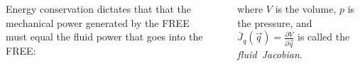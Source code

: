 \documentclass[25pt, a0paper, portrait]{tikzposter}
\begin{document}
\begin{columns}
{{    \vspace{25pt}
    
    Energy conservation dictates that that the mechanical power generated by the FREE must equal the fluid power that goes into the FREE:
    
    \vspace{12pt}
    \begin{centering}
    \end{centering}
    where $V$ is the volume, $p$ is the pressure, and $\bar{J}_q (\vec{q}) = \frac{\partial V}{\partial \vec{q}}$ is called the \emph{fluid~Jacobian}.
    }
    
}
\end{columns}
\end{document}
